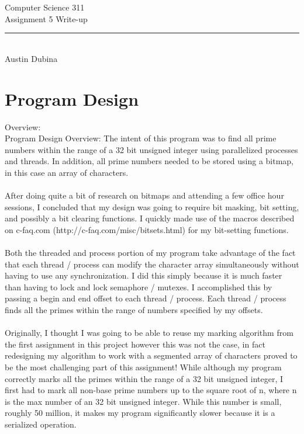 \documentclass[12pt,letterpaper]{article}
\begin{document}
\begin{titlepage}
    \vspace*{4cm}
    \begin{flushleft}
    {\huge
        Computer Science 311\\[.5cm]
    }
    {\large
        Assignment 5 Write-up
    }
    \end{flushleft}
    \vfill
    \rule{5in}{.5mm}\\
    Austin Dubina

\end{titlepage}

\section{Program Design}
{\large Overview:}
\\
Program Design
Overview:
The intent of this program was to find all prime numbers within the range of a 32 bit unsigned integer using parallelized processes and threads. In addition, all prime numbers needed to be stored using a bitmap, in this case an array of characters.
\\\\
After doing quite a bit of research on bitmaps and attending a few office hour sessions, I concluded that my design was going to require bit masking, bit setting, and possibly a bit clearing functions. I quickly made use of the macros described on c-faq.com (http://c-faq.com/misc/bitsets.html) for my bit-setting functions.
\\\\
Both the threaded and process portion of my program take advantage of the fact that each thread / process can modify the character array simultaneously without having to use any synchronization. I did this simply because it is much faster than having to lock and lock semaphore / mutexes. I accomplished this by passing a begin and end offset to each thread / process. Each thread / process finds all the primes within the range of numbers specified by my offsets.
\\\\
Originally, I thought I was going to be able to reuse my marking algorithm from the first assignment in this project however this was not the case, in fact redesigning my algorithm to work with a segmented array of characters proved to be the most challenging part of this assignment! While although my program correctly marks all the primes within the range of a 32 bit unsigned integer, I first had to mark all non-base prime numbers up to the square root of n, where n is the max number of an 32 bit unsigned integer. While this number is small, roughly 50 million, it makes my program significantly slower because it is a serialized operation.   
\end{document}
